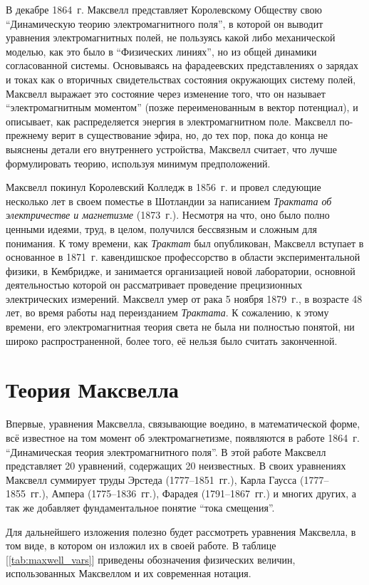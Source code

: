 \documentclass[12pt, oneside, a4paper]{article}
\begin{document}
В декабре 1864~г. Максвелл представляет Королевскому Обществу свою ``Динамическую теорию электромагнитного поля'', в которой он выводит уравнения электромагнитных полей, не пользуясь какой либо механической моделью, как это было в ``Физических линиях'', но из общей динамики согласованной системы. Основываясь на фарадеевских представлениях о зарядах и токах как о вторичных свидетельствах состояния окружающих систему полей, Максвелл выражает это состояние через изменение того, что он называет ``электромагнитным моментом'' (позже переименованным в вектор потенциал), и описывает, как распределяется энергия в электромагнитном поле. Максвелл по-прежнему верит в существование эфира, но, до тех пор, пока до конца не выяснены детали его внутреннего устройства, Максвелл считает, что лучше формулировать теорию, используя минимум предположений. 

Максвелл покинул Королевский Колледж в 1856~г. и провел следующие несколько лет в своем поместье в Шотландии за написанием  \emph{Трактата об электричестве и магнетизме} (1873~г.). Несмотря на что, оно было полно ценными идеями, труд, в целом, получился бессвязным и сложным для понимания. К тому времени, как \emph{Трактат} был опубликован, Максвелл вступает в основанное в 1871~г. кавендишское профессорство в области экспериментальной физики, в Кембридже, и занимается организацией новой лаборатории, основной деятельностью которой он рассматривает проведение прецизионных электрических измерений. Максвелл умер от рака 5 ноября 1879~г., в возрасте 48 лет, во время работы над переизданием \emph{Трактата}. К сожалению, к этому времени, его электромагнитная теория света не была ни полностью понятой, ни широко распространенной, более того, её нельзя было считать законченной.
\section{Теория Максвелла}
Впервые, уравнения Максвелла, связывающие воедино, в математической форме, всё известное на том момент об электромагнетизме, появляются в работе 1864~г. ``Динамическая теория электромагнитного поля''. В этой работе Максвелл представляет 20 уравнений, содержащих 20 неизвестных.  В своих уравнениях Максвелл суммирует труды Эрстеда (1777--1851~гг.), Карла Гаусса (1777--1855~гг.), Ампера (1775--1836~гг.), Фарадея (1791--1867~гг.) и многих других, а так же добавляет фундаментальное понятие ``тока смещения''.

Для дальнейшего изложения полезно будет рассмотреть  уравнения Максвелла, в том виде, в котором он изложил их в своей работе. В таблице [\ref{tab:maxwell_vars}] приведены обозначения физических величин, использованных Максвеллом и их современная нотация. 
\end{document}
